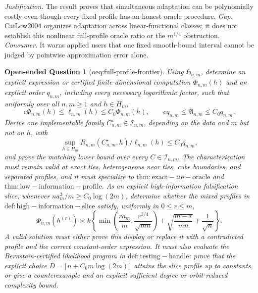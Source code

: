 \documentclass{article}
\newtheorem{openendedquestion}{Open-ended Question}
\begin{document}
\par\smallskip\noindent \textit{Justification.} The result proves that simultaneous adaptation can be polynomially costly even though every fixed profile has an honest oracle procedure. \textit{Gap.} CaiLow2004 organizes adaptation across linear-functional classes; it does not establish this nonlinear full-profile oracle ratio or the \(m^{1/4}\) obstruction. \textit{Consumer.} It warns applied users that one fixed smooth-bound interval cannot be judged by pointwise approximation error alone.

\begin{openendedquestion}[oeq:full-profile-frontier]\label{oeq:full-profile-frontier}
Using \(\mathfrak H_{n,m}\), determine an explicit expression or certified finite-dimensional computation \(\Phi_{n,m}(h)\) and an explicit order \(q_{n,m}\), including every necessary logarithmic factor, such that uniformly over all \(n,m\ge1\) and \(h\in H_m\), \[c\Phi_{n,m}(h)\le\ell_{n,m}(h)\le C_0\Phi_{n,m}(h),\qquad c q_{n,m}\le\mathfrak A_{n,m}\le C_0 q_{n,m}.\] Derive one implementable family \(C_{n,m}^{\star}\in\mathcal I_{n,m}\), depending on the data and \(m\) but not on \(h\), with \[\sup_{h\in H_m}R_{n,m}(C_{n,m}^{\star},h)/\ell_{n,m}(h)\le C_0q_{n,m},\] and prove the matching lower bound over every \(C\in\mathcal I_{n,m}\). The characterization must remain valid at exact ties, heterogeneous near ties, cube boundaries, and separated profiles, and it must specialize to \(\mathrm{thm:exact-tie-oracle}\) and \(\mathrm{thm:low-information-profile}\). As an explicit high-information falsification slice, whenever \(na_m^2/m\ge C_0\log(2m)\), determine whether the mixed profiles in \(\mathrm{def:high-information-slice}\) satisfy, uniformly in \(0\le r\le m\), \[\Phi_{n,m}(h^{(r)})\asymp k\left\{\min\left(\frac{ra_m}{m},\frac{r^{3/4}}{\sqrt{mn}}\right)+\sqrt{\frac{m-r}{mn}}+\frac1{\sqrt n}\right\}.\] A valid solution must either prove this display or replace it with a contradicted profile and the correct constant-order expression. It must also evaluate the Bernstein-certified likelihood program in \(\mathrm{def:testing-handle}\): prove that the explicit choice \(D=\lceil n+C_0m\log(2m)\rceil\) attains the slice profile up to constants, or give a counterexample and an explicit sufficient degree or orbit-reduced complexity bound.
\end{openendedquestion}
\end{document}
